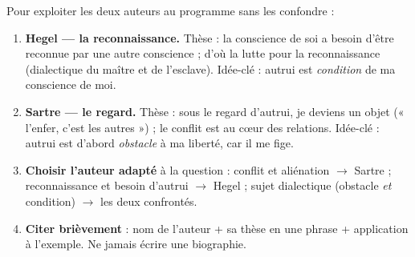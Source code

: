 \documentclass[11pt]{article}
\begin{document}
\begin{methode}
Pour exploiter les deux auteurs au programme sans les confondre :
\begin{enumerate}
\item \textbf{Hegel — la reconnaissance.} Thèse : la conscience de soi a besoin d'être reconnue par une autre conscience ; d'où la lutte pour la reconnaissance (dialectique du maître et de l'esclave). Idée-clé : autrui est \emph{condition} de ma conscience de moi.
\item \textbf{Sartre — le regard.} Thèse : sous le regard d'autrui, je deviens un objet (« l'enfer, c'est les autres ») ; le conflit est au cœur des relations. Idée-clé : autrui est d'abord \emph{obstacle} à ma liberté, car il me fige.
\item \textbf{Choisir l'auteur adapté} à la question : conflit et aliénation $\rightarrow$ Sartre ; reconnaissance et besoin d'autrui $\rightarrow$ Hegel ; sujet dialectique (obstacle \emph{et} condition) $\rightarrow$ les deux confrontés.
\item \textbf{Citer brièvement} : nom de l'auteur + sa thèse en une phrase + application à l'exemple. Ne jamais écrire une biographie.
\end{enumerate}
\end{methode}
\end{document}
